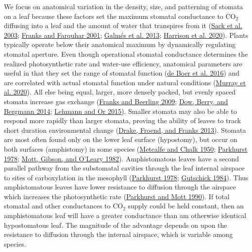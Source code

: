 \documentclass[
  12pt,
]{article}
\begin{document}
We focus on anatomical variation in the density, size, and patterning of stomata on a leaf because these factors set the maximum stomatal conductance to CO\(_2\) diffusing into a leaf and the amount of water that transpires from it (\protect\hyperlink{ref-sack_hydrology_2003}{Sack et al. 2003}; \protect\hyperlink{ref-franks_effect_2001}{Franks and Farquhar 2001}; \protect\hyperlink{ref-galmes_leaf_2013}{Galmés et al. 2013}; \protect\hyperlink{ref-harrison_influence_2020}{Harrison et al. 2020}). Plants typically operate below their anatomical maximum by dynamically regulating stomatal aperture. Even though operational stomatal conductance determines the realized photosynthetic rate and water-use efficiency, anatomical parameters are useful in that they set the range of stomatal function (\protect\hyperlink{ref-de_boer_optimal_2016}{de Boer et al. 2016}) and are correlated with actual stomatal function under natural conditions (\protect\hyperlink{ref-murray_consistent_2020}{Murray et al. 2020}). All else being equal, larger, more densely packed, but evenly spaced stomata increase gas exchange (\protect\hyperlink{ref-franks_maximum_2009}{Franks and Beerling 2009}; \protect\hyperlink{ref-dow_physiological_2014}{Dow, Berry, and Bergmann 2014}; \protect\hyperlink{ref-lehmann_effects_2015}{Lehmann and Or 2015}). Smaller stomata may also be able to respond more rapidly than larger stomata, proving the ability of leaves to track short duration environmental change (\protect\hyperlink{ref-drake_smaller_2013}{Drake, Froend, and Franks 2013}). Stomata are most often found only on the lower leaf surface (hypostomy), but occur on both surfaces (amphistomy) in some species (\protect\hyperlink{ref-metcalfe_anatomy_1950}{Metcalfe and Chalk 1950}; \protect\hyperlink{ref-parkhurst_adaptive_1978}{Parkhurst 1978}; \protect\hyperlink{ref-mott_adaptive_1982}{Mott, Gibson, and O'Leary 1982}). Amphistomatous leaves have a second parallel pathway from the substomatal cavities through the leaf internal airspace to sites of carboxylation in the mesophyll (\protect\hyperlink{ref-parkhurst_adaptive_1978}{Parkhurst 1978}; \protect\hyperlink{ref-gutschick_photosynthesis_1984}{Gutschick 1984}). Thus amphistomatous leaves have lower resistance to diffusion through the airspace which increases the photosynthetic rate (\protect\hyperlink{ref-parkhurst_intercellular_1990}{Parkhurst and Mott 1990}). If total stomatal and other conductances to CO\(_2\) supply could be held constant, then an amphistomatous leaf will have a greater conductance than am otherwise identical hypostomatous leaf. The magnitude of the advantage depends on upon the resistance to diffusion through the internal airspace, which is variable among species.
\end{document}

